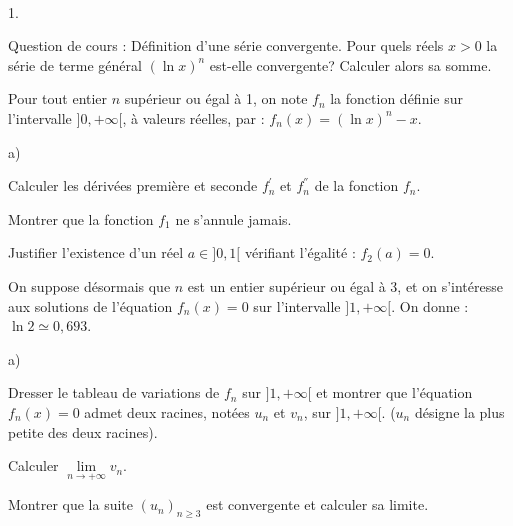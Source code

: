 \documentclass[11pt]{article}%
\begin{document}
\begin{exerciceAP}~
  \begin{noliste}{1.}
    \setlength{\itemsep}{2mm}
  \item Question de cours : Définition d'une série convergente. Pour
    quels réels $x >0$ la série de terme général $(\ln x)^n$ est-elle
    convergente? Calculer alors sa somme.

  \item Pour tout entier $n$ supérieur ou égal à 1, on note $f_n$ la
    fonction définie sur l'intervalle $]0,+\infty[$, à valeurs
    réelles, par : $f_n(x)= (\ln x)^n-x$.
    \begin{noliste}{a)}
    \setlength{\itemsep}{2mm}
    \item Calculer les dérivées première et seconde $f_n^{'}$ et
      $f_n^{''}$ de la fonction $f_n$.
    \item Montrer que la fonction $f_1$ ne s'annule jamais.
    \item Justifier l'existence d'un réel $a \in ]0,1[$ vérifiant
      l'égalité : $f_2(a)=0$.
    \end{noliste}
  \item On suppose désormais que $n$ est un entier supérieur ou égal à
    3, et on s'intéresse aux solutions de l'équation $f_n(x)=0$ sur
    l'intervalle $]1,+\infty[$. On donne : $\ln 2 \simeq 0,693$.
    \begin{noliste}{a)}
    \setlength{\itemsep}{2mm}
    \item Dresser le tableau de variations de $f_n$ sur $]1,+\infty[$
      et montrer que l'équation $f_n(x)=0$ admet deux racines, notées
      $u_n$ et $v_n$, sur $]1,+\infty[$. ($u_n$ désigne la plus petite
      des deux racines).
    \item Calculer $\lim \limits_{n \to +\infty} v_n$.
    \end{noliste}
  \item Montrer que la suite $(u_n)_{n \geq 3} $ est convergente et
    calculer sa limite.
  \end{noliste}
\end{exerciceAP}
\end{document}

